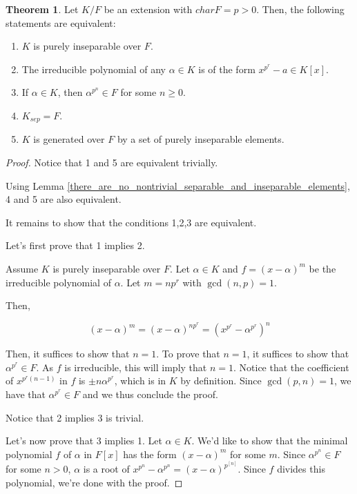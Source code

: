\documentclass{article}
\theoremstyle{definition}
\newtheorem{theorem}{Theorem}[section]
\begin{document}
\begin{theorem}\label{characterizations_of_purely_inseparable_extensions}
    Let $K/F$ be an extension with $charF = p > 0$.
    Then, the following statements are equivalent:

    \begin{enumerate}
        \item $K$ is purely inseparable over $F$.
        \item The irreducible polynomial of any $\alpha \in K$ is of the form $x^{p^{r}} - a \in K[x]$.
        \item If $\alpha \in K$, then $\alpha^{p^{n}} \in F$ for some $n \geq 0$.
        \item $K_{sep} = F$.
        \item $K$ is generated over $F$ by a set of purely inseparable elements.
    \end{enumerate}
\end{theorem}
\begin{proof}
    Notice that 1 and 5 are equivalent trivially.

    Using Lemma \ref{there_are_no_nontrivial_separable_and_inseparable_elements}, 4 and 5 are
    also equivalent.

    It remains to show that the conditions 1,2,3 are equivalent.

    Let's first prove that 1 implies 2.

    Assume $K$ is purely inseparable over $F$.
    Let $\alpha \in K$ and $f = {(x - \alpha)}^{m}$ be the irreducible
    polynomial of $\alpha$. Let $m = n p ^{r}$ with $\gcd(n,p) = 1$.
    
    Then, 
    
    \[{(x - \alpha)}^{m} = {(x - \alpha)}^{n p ^{r}} = {(x^{p^{r}} - \alpha^{p^{r}})}^{n}\] 

    Then, it suffices to show that $n = 1$. To prove that $n = 1$,
    it suffices to show that $\alpha^{p^{r}} \in F$. As $f$
    is irreducible, this will imply that $n = 1$. Notice that
    the coefficient of $x^{p^{r}(n-1)}$ in $f$ is $\pm n \alpha^{p^{r}}$,
    which is in $K$ by definition. Since $\gcd(p,n) = 1$, we have that
    $\alpha^{p^{r}} \in F$ and we thus conclude the proof.

    Notice that 2 implies 3 is trivial.

    Let's now prove that 3 implies 1.
    Let $\alpha \in K$. We'd like to show that the minimal polynomial $f$ of $\alpha$ in $F[x]$
    has the form ${(x - \alpha)}^m$ for some $m$. Since $\alpha^{p^{n}} \in F$ for some $n > 0$,
    $\alpha$ is a root of $x^{p^{n}} - \alpha^{p^{n}} = (x - \alpha)^{p^[n]}$. Since $f$
    divides this polynomial, we're done with the proof.
\end{proof}
\end{document}

